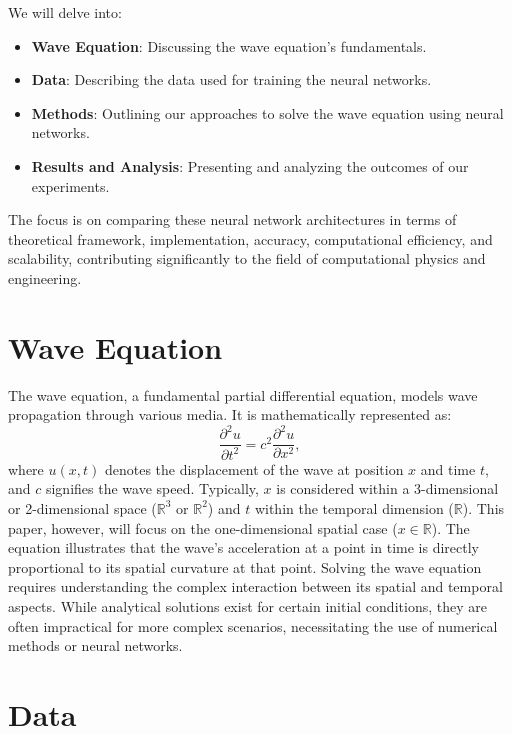 \documentclass[twoside,11pt]{report}
\begin{document}
    We will delve into:
    \begin{itemize}
    \item \textbf{Wave Equation}: Discussing the wave equation's fundamentals.
    \item \textbf{Data}: Describing the data used for training the neural networks.
    \item \textbf{Methods}: Outlining our approaches to solve the wave equation using neural networks.
    \item \textbf{Results and Analysis}: Presenting and analyzing the outcomes of our experiments.
    \end{itemize}
    The focus is on comparing these neural network architectures in terms of theoretical framework, 
    implementation, accuracy, computational efficiency, and scalability, contributing significantly 
    to the field of computational physics and engineering.

\section{Wave Equation}
\label{sec:wave}

    The wave equation, a fundamental partial differential equation, models wave propagation through 
    various media. It is mathematically represented as:
    \begin{equation}
    \frac{\partial^2 u}{\partial t^2} = c^2 \frac{\partial^2 u}{\partial x^2},
    \end{equation}
    where $u(x,t)$ denotes the displacement of the wave at position $x$ and time $t$, and $c$  
    signifies the wave speed. Typically, $x$ is considered within a 3-dimensional or 2-dimensional 
    space ($\mathbb{R}^3$ or $\mathbb{R}^2$) and $t$ within the temporal dimension ($\mathbb{R}$). 
    This paper, however, will focus on the one-dimensional spatial case ($x \in \mathbb{R}$).
    The equation illustrates that the wave's acceleration at a point in time is directly proportional to 
    its spatial curvature at that point. Solving the wave equation requires understanding the complex 
    interaction between its spatial and temporal aspects. While analytical solutions exist for certain 
    initial conditions, they are often impractical for more complex scenarios, necessitating the use of 
    numerical methods or neural networks.

\section{Data}
\label{sec:data}
\end{document}
